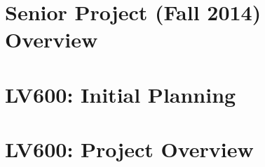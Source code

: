 \documentclass[letterpaper, 10 pt]{report}
\begin{document}
\newpage

\section{Senior Project (Fall 2014) Overview}

\newpage

\section{LV600: Initial Planning}

\newpage

\section{LV600: Project Overview}

\newpage

%

\end{document}
